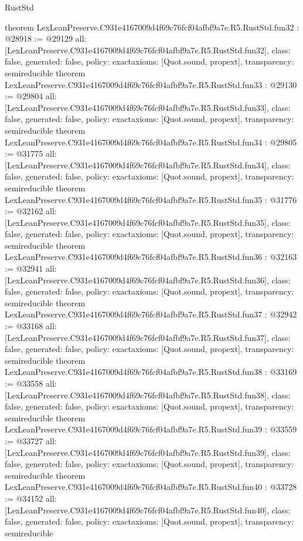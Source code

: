 \begin{lexlean}{RustStd}
\begin{coremodule}
{}
theorem LexLeanPreserve.C931e4167009d4f69c76fcf04afbf9a7e.R5.RustStd.fun32 : @28918 := @29129 {
  all: [LexLeanPreserve.C931e4167009d4f69c76fcf04afbf9a7e.R5.RustStd.fun32],
  class: false,
  generated: false,
  policy: exact{axioms: [Quot.sound, propext]},
  transparency: semireducible
}
theorem LexLeanPreserve.C931e4167009d4f69c76fcf04afbf9a7e.R5.RustStd.fun33 : @29130 := @29804 {
  all: [LexLeanPreserve.C931e4167009d4f69c76fcf04afbf9a7e.R5.RustStd.fun33],
  class: false,
  generated: false,
  policy: exact{axioms: [Quot.sound, propext]},
  transparency: semireducible
}
theorem LexLeanPreserve.C931e4167009d4f69c76fcf04afbf9a7e.R5.RustStd.fun34 : @29805 := @31775 {
  all: [LexLeanPreserve.C931e4167009d4f69c76fcf04afbf9a7e.R5.RustStd.fun34],
  class: false,
  generated: false,
  policy: exact{axioms: [Quot.sound, propext]},
  transparency: semireducible
}
theorem LexLeanPreserve.C931e4167009d4f69c76fcf04afbf9a7e.R5.RustStd.fun35 : @31776 := @32162 {
  all: [LexLeanPreserve.C931e4167009d4f69c76fcf04afbf9a7e.R5.RustStd.fun35],
  class: false,
  generated: false,
  policy: exact{axioms: [Quot.sound, propext]},
  transparency: semireducible
}
theorem LexLeanPreserve.C931e4167009d4f69c76fcf04afbf9a7e.R5.RustStd.fun36 : @32163 := @32941 {
  all: [LexLeanPreserve.C931e4167009d4f69c76fcf04afbf9a7e.R5.RustStd.fun36],
  class: false,
  generated: false,
  policy: exact{axioms: [Quot.sound, propext]},
  transparency: semireducible
}
theorem LexLeanPreserve.C931e4167009d4f69c76fcf04afbf9a7e.R5.RustStd.fun37 : @32942 := @33168 {
  all: [LexLeanPreserve.C931e4167009d4f69c76fcf04afbf9a7e.R5.RustStd.fun37],
  class: false,
  generated: false,
  policy: exact{axioms: [Quot.sound, propext]},
  transparency: semireducible
}
theorem LexLeanPreserve.C931e4167009d4f69c76fcf04afbf9a7e.R5.RustStd.fun38 : @33169 := @33558 {
  all: [LexLeanPreserve.C931e4167009d4f69c76fcf04afbf9a7e.R5.RustStd.fun38],
  class: false,
  generated: false,
  policy: exact{axioms: [Quot.sound, propext]},
  transparency: semireducible
}
theorem LexLeanPreserve.C931e4167009d4f69c76fcf04afbf9a7e.R5.RustStd.fun39 : @33559 := @33727 {
  all: [LexLeanPreserve.C931e4167009d4f69c76fcf04afbf9a7e.R5.RustStd.fun39],
  class: false,
  generated: false,
  policy: exact{axioms: [Quot.sound, propext]},
  transparency: semireducible
}
theorem LexLeanPreserve.C931e4167009d4f69c76fcf04afbf9a7e.R5.RustStd.fun40 : @33728 := @34152 {
  all: [LexLeanPreserve.C931e4167009d4f69c76fcf04afbf9a7e.R5.RustStd.fun40],
  class: false,
  generated: false,
  policy: exact{axioms: [Quot.sound, propext]},
  transparency: semireducible
}
\end{coremodule}
\end{lexlean}
